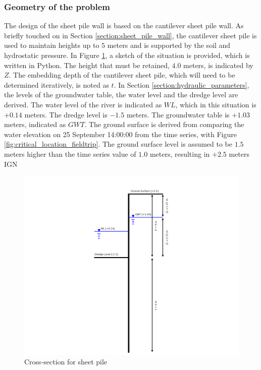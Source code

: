 \subsubsection{Geometry of the problem}

The design of the sheet pile wall is based on the cantilever sheet pile wall. As briefly touched on in Section \ref{section:sheet_pile_wall}, the cantilever sheet pile is used to maintain heights up to $5$ meters and is supported by the soil and hydrostatic pressure. In Figure \ref{fig:problem_description_sheetpiles}, a sketch of the situation is provided, which is written in Python. The height that must be retained, $4.0$ meters, is indicated by $Z$. The embedding depth of the cantilever sheet pile, which will need to be determined iteratively, is noted as $t$. In  Section \ref{section:hydraulic_parameters}, the levels of the groundwater table, the water level and the dredge level are derived. The water level of the river is indicated as $WL$, which in this situation is $+0.14$ meters. The dredge level is $-1.5$ meters. The groundwater table is $+1.03$ meters, indicated as $GWT$. The ground surface is derived from comparing the water elevation on 25 September 14:00:00 from the time series, with Figure \ref{fig:critical_location_fieldtrip}. The ground surface level is assumed to be $1.5$ meters higher than the time series value of $1.0$ meters, resulting in $+2.5$ meters IGN

\begin{figure}[H]
    \centering
    \includegraphics[width=0.90\linewidth]{figures/ch8/cross_section.png}
    \caption{Cross-section for sheet pile}
    \label{fig:problem_description_sheetpiles}
\end{figure}

